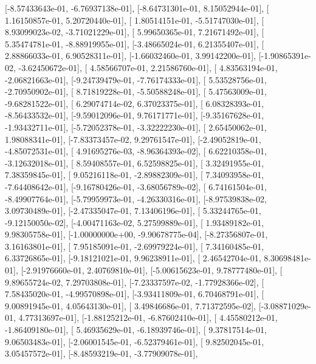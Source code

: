 \documentclass{article}
\begin{document}
       [-8.57433643e-01, -6.76937138e-01],
       [-8.64731301e-01,  8.15052944e-01],
       [ 1.16150857e-01,  5.20720440e-01],
       [ 1.80514151e-01, -5.51747030e-01],
       [ 8.93099023e-02, -3.71021229e-01],
       [ 5.99650365e-01,  7.21671492e-01],
       [ 5.35474781e-01, -8.88919955e-01],
       [-3.48665024e-01,  6.21355407e-01],
       [ 2.88866033e-01,  6.90528311e-01],
       [-1.66032460e-01,  3.99142200e-01],
       [-1.90865391e-02, -3.62450672e-01],
       [ 4.58566707e-01,  2.21586760e-01],
       [ 4.83563194e-01, -2.06821663e-01],
       [-9.24739479e-01, -7.76174333e-01],
       [ 5.53528756e-01, -2.70950902e-01],
       [ 8.71819228e-01, -5.50588248e-01],
       [ 5.47563009e-01, -9.68281522e-01],
       [ 6.29074714e-02,  6.37023375e-01],
       [ 6.08328393e-01, -8.56433532e-01],
       [-9.59012096e-01,  9.76171771e-01],
       [-9.35167628e-01, -1.93432711e-01],
       [-5.72052378e-01, -3.32222230e-01],
       [ 2.65450062e-01,  1.98088341e-01],
       [-7.83373457e-02,  9.29761547e-01],
       [-2.49052819e-01, -4.85072531e-01],
       [ 4.91695276e-03, -8.96364393e-02],
       [ 6.62210358e-01, -3.12632018e-01],
       [ 8.59408557e-01,  6.52598825e-01],
       [ 3.32491955e-01,  7.38359845e-01],
       [ 9.05216118e-01, -2.89882309e-01],
       [ 7.34093958e-01, -7.64408642e-01],
       [-9.16780426e-01, -3.68056789e-02],
       [ 6.74161504e-01, -8.49907764e-01],
       [-5.79959973e-01, -4.26330316e-01],
       [-8.97539838e-02,  3.09730489e-01],
       [-2.47335047e-01,  7.13406196e-01],
       [ 5.33244765e-01, -9.12150050e-02],
       [-4.00471163e-02,  5.27599889e-01],
       [ 1.93489182e-01,  9.98305758e-01],
       [-1.00000000e+00, -9.90678775e-04],
       [-8.27356807e-01,  3.16163801e-01],
       [ 7.95185091e-01, -2.69979224e-01],
       [ 7.34160485e-01,  6.33726865e-01],
       [-9.18121021e-01,  9.96238911e-01],
       [ 2.46542704e-01,  8.30698481e-01],
       [-2.91976660e-01,  2.40769810e-01],
       [-5.00615623e-01,  9.78777480e-01],
       [ 9.89655724e-02,  7.29703808e-01],
       [-7.23337597e-02, -1.77928366e-02],
       [ 7.58435020e-01, -4.99570898e-01],
       [-3.93411809e-01,  6.70468791e-01],
       [ 9.00891945e-01,  4.05643130e-01],
       [ 3.49846686e-01,  7.71372595e-02],
       [-3.08871029e-01,  4.77313697e-01],
       [-1.88125212e-01, -6.87602410e-01],
       [ 4.45580212e-01, -1.86409180e-01],
       [ 5.46935629e-01, -6.18939746e-01],
       [ 9.37817514e-01,  9.06503483e-01],
       [-2.06001545e-01, -6.52379461e-01],
       [ 9.82502045e-01,  3.05457572e-01],
       [-8.48593219e-01, -3.77909078e-01],
\end{document}
